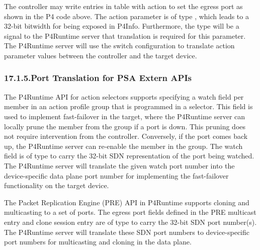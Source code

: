 \documentclass[11pt]{article}
\begin{document}
{%
\noindent{}The controller may write entries in table  with action  to set the egress
port as shown in the P4 code above. The action parameter  is of type
, which leads to a 32-bit bitwidth for  being exposed in
P4Info. Furthermore, the type will be a signal to the P4Runtime server that
translation is required for this parameter. The P4Runtime server will use the
switch configuration to translate action parameter values between the controller
and the target device.%

\subsubsection{17.1.5.\hspace*{0.5em}Port Translation for PSA Extern APIs}\label{sec-port-translation-for-psa-extern-apis}%

\noindent{}The P4Runtime API for action selectors supports specifying a watch field per
member in an action profile group that is programmed in a selector. This field
is used to implement fast-failover in the target, where the P4Runtime server can
locally prune the member from the group if a port is down. This pruning does not
require intervention from the controller. Conversely, if the port comes back up,
the P4Runtime server can re-enable the member in the group. The watch field is
of type  to carry the 32-bit SDN representation of the port being
watched. The P4Runtime server will translate the given watch port number into
the device-specific data plane port number for implementing the fast-failover
functionality on the target device.%

The Packet Replication Engine (PRE) API in P4Runtime supports cloning and
multicasting to a set of ports. The egress port fields defined in the PRE
multicast entry and clone session entry are of type  to carry the 32-bit
SDN port number(s). The P4Runtime server will translate these SDN port numbers
to device-specific port numbers for multicasting and cloning in the data plane.%

}
\end{document}
